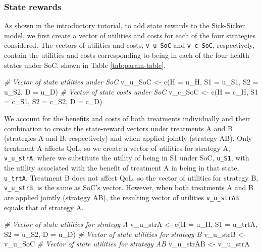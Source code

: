 \documentclass[
]{article}
\newenvironment{Shaded}{\begin{snugshade}}{\end{snugshade}}
\newcommand{\AttributeTok}[1]{\textcolor[rgb]{0.77,0.63,0.00}{#1}}
\newcommand{\CommentTok}[1]{\textcolor[rgb]{0.56,0.35,0.01}{\textit{#1}}}
\newcommand{\FunctionTok}[1]{\textcolor[rgb]{0.00,0.00,0.00}{#1}}
\newcommand{\NormalTok}[1]{#1}
\newcommand{\OtherTok}[1]{\textcolor[rgb]{0.56,0.35,0.01}{#1}}
\begin{document}
\hypertarget{state-rewards}{%
\subsubsection{State rewards}\label{state-rewards}}

As shown in the introductory tutorial, to add state rewards to the Sick-Sicker model, we first create a vector of utilities and costs for each of the four strategies considered. The vectors of utilities and costs, \texttt{v\_u\_SoC} and \texttt{v\_c\_SoC}, respectively, contain the utilities and costs corresponding to being in each of the four health states under SoC, shown in Table \ref{tab:param-table}.

\begin{Shaded}
\begin{Highlighting}[]
\CommentTok{\# Vector of state utilities under SoC}
\NormalTok{v\_u\_SoC }\OtherTok{\textless{}{-}} \FunctionTok{c}\NormalTok{(}\AttributeTok{H =}\NormalTok{ u\_H, }\AttributeTok{S1 =}\NormalTok{ u\_S1, }\AttributeTok{S2 =}\NormalTok{ u\_S2, }\AttributeTok{D =}\NormalTok{ u\_D)}
\CommentTok{\# Vector of state costs under SoC}
\NormalTok{v\_c\_SoC }\OtherTok{\textless{}{-}} \FunctionTok{c}\NormalTok{(}\AttributeTok{H =}\NormalTok{ c\_H, }\AttributeTok{S1 =}\NormalTok{ c\_S1, }\AttributeTok{S2 =}\NormalTok{ c\_S2, }\AttributeTok{D =}\NormalTok{ c\_D)}
\end{Highlighting}
\end{Shaded}

We account for the benefits and costs of both treatments individually and their combination to create the state-reward vectors under treatments A and B (strategies A and B, respectively) and when applied jointly (strategy AB). Only treatment A affects QoL, so we create a vector of utilities for strategy A, \texttt{v\_u\_strA}, where we substitute the utility of being in S1 under SoC, \texttt{u\_S1}, with the utility associated with the benefit of treatment A in being in that state, \texttt{u\_trtA}. Treatment B does not affect QoL, so the vector of utilities for strategy B, \texttt{v\_u\_strB}, is the same as SoC's vector. However, when both treatments A and B are applied jointly (strategy AB), the resulting vector of utilities \texttt{v\_u\_strAB} equals that of strategy A.

\begin{Shaded}
\begin{Highlighting}[]
\CommentTok{\# Vector of state utilities for strategy A}
\NormalTok{v\_u\_strA }\OtherTok{\textless{}{-}} \FunctionTok{c}\NormalTok{(}\AttributeTok{H =}\NormalTok{ u\_H, }\AttributeTok{S1 =}\NormalTok{ u\_trtA, }\AttributeTok{S2 =}\NormalTok{ u\_S2, }\AttributeTok{D =}\NormalTok{ u\_D)}
\CommentTok{\# Vector of state utilities for strategy B}
\NormalTok{v\_u\_strB }\OtherTok{\textless{}{-}}\NormalTok{ v\_u\_SoC}
\CommentTok{\# Vector of state utilities for strategy AB}
\NormalTok{v\_u\_strAB }\OtherTok{\textless{}{-}}\NormalTok{ v\_u\_strA}
\end{Highlighting}
\end{Shaded}
\end{document}
